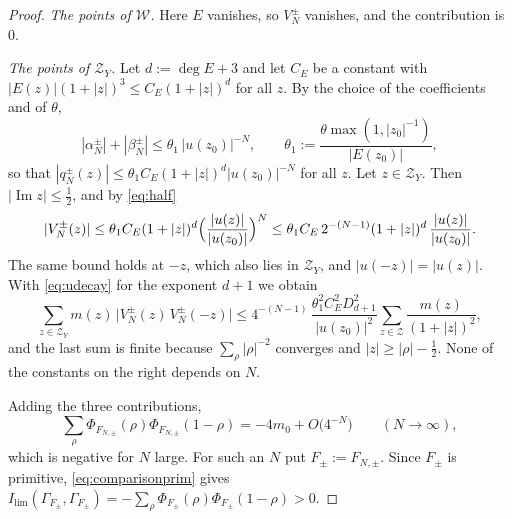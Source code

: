 \documentclass[11pt]{amsart}
\theoremstyle{remark}
\numberwithin{equation}{section}
\newcommand{\Iml}{\operatorname{Im}}
\newcommand{\Il}{I_{\lim}}
\begin{document}
\begin{proof}
\emph{The points of $\mathcal W$.}  Here $E$ vanishes, so $V_N^\pm$ vanishes,
and the contribution is $0$.

\emph{The points of $\mathcal Z_Y$.}  Let $d:=\deg E+3$ and let $C_E$ be a
constant with $|E(z)|(1+|z|)^3\le C_E(1+|z|)^d$ for all $z$.  By the choice
of the coefficients and of $\theta$,
\[
  |\alpha_N^\pm|+|\beta_N^\pm|\le\theta_1\,|u(z_0)|^{-N},\qquad
  \theta_1:=\frac{\theta\max(1,|z_0|^{-1})}{|E(z_0)|},
\]
so that $|q_N^\pm(z)|\le\theta_1C_E(1+|z|)^d|u(z_0)|^{-N}$ for all $z$.  Let
$z\in\mathcal Z_Y$.  Then $|\Iml z|\le\tfrac12$, and by \eqref{eq:half}
\[
  |V_N^\pm(z)|\le\theta_1C_E(1+|z|)^d\Bigl(\frac{|u(z)|}{|u(z_0)|}\Bigr)^N
  \le\theta_1C_E\,2^{-(N-1)}(1+|z|)^d\,\frac{|u(z)|}{|u(z_0)|}.
\]
The same bound holds at $-z$, which also lies in $\mathcal Z_Y$, and
$|u(-z)|=|u(z)|$.  With \eqref{eq:udecay} for the exponent $d+1$ we obtain
\[
  \sum_{z\in\mathcal Z_Y}m(z)\,\bigl|V_N^\pm(z)\,V_N^\pm(-z)\bigr|
  \le4^{-(N-1)}\,\frac{\theta_1^2C_E^2D_{d+1}^2}{|u(z_0)|^2}
     \sum_{z\in\mathcal Z}\frac{m(z)}{(1+|z|)^2},
\]
and the last sum is finite because $\sum_\rho|\rho|^{-2}$ converges and
$|z|\ge|\rho|-\frac12$.  None of the constants on the right depends on $N$.

Adding the three contributions,
\[
  \sum_\rho\Phi_{F_{N,\pm}}(\rho)\Phi_{F_{N,\pm}}(1-\rho)
  =-4m_0+O\bigl(4^{-N}\bigr)\qquad(N\to\infty),
\]
which is negative for $N$ large.  For such an $N$ put $F_\pm:=F_{N,\pm}$.
Since $F_\pm$ is primitive, \eqref{eq:comparisonprim} gives
$\Il(\Gamma_{F_\pm},\Gamma_{F_\pm})
=-\sum_\rho\Phi_{F_\pm}(\rho)\Phi_{F_\pm}(1-\rho)>0$.
\end{proof}
\end{document}
